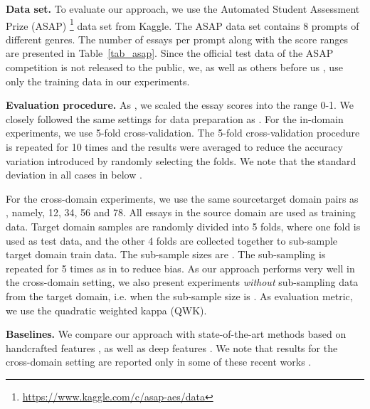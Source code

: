 \documentclass[11pt,a4paper]{article}
\begin{document}
\noindent
{\bf Data set.}
To evaluate our approach, we use the Automated Student Assessment Prize (ASAP) \footnote{\scriptsize{\url{https://www.kaggle.com/c/asap-aes/data}}} data set from Kaggle. The ASAP data set contains 8 prompts of different genres. The number of essays per prompt along with the score ranges are presented in Table~\ref{tab_asap}. Since the official test data of the ASAP competition is not released to the public, we, as well as others before us \cite{Phandi-EMNLP-2015,Dong-EMNLP-2016,Dong-CONLL-2017,Tay-ACL-2018}, use only the training data in our experiments.

\noindent
{\bf Evaluation procedure.}
As , we scaled the essay scores into the range 0-1. We closely followed the same settings for data preparation as \cite{Phandi-EMNLP-2015,Dong-EMNLP-2016}. For the in-domain experiments, we use 5-fold cross-validation. The 5-fold cross-validation procedure is repeated for 10 times and the results were averaged to reduce the accuracy variation introduced by randomly selecting the folds. We note that the standard deviation in all cases in below .

For the cross-domain experiments, we use the same sourcetarget domain pairs as \cite{Phandi-EMNLP-2015,Dong-EMNLP-2016}, namely, 12, 34, 56 and 78. All essays in the source domain are used as training data. Target domain samples are randomly divided into 5 folds, where one fold is used as test data, and the other 4 folds are collected together to sub-sample target domain train data. The sub-sample sizes are . The sub-sampling is repeated for 5 times as in \cite{Phandi-EMNLP-2015,Dong-EMNLP-2016} to reduce bias. As our approach performs very well in the cross-domain setting, we also present experiments \emph{without} sub-sampling data from the target domain, i.e. when the sub-sample size is . As evaluation metric, we use the quadratic weighted kappa (QWK).

\noindent
{\bf Baselines.}
We compare our approach with state-of-the-art methods based on handcrafted features \cite{Phandi-EMNLP-2015}, as well as deep features \cite{Dong-EMNLP-2016,Dong-CONLL-2017,Tay-ACL-2018}. We note that results for the cross-domain setting are reported only in some of these recent works \cite{Phandi-EMNLP-2015,Dong-EMNLP-2016}.
\end{document}
